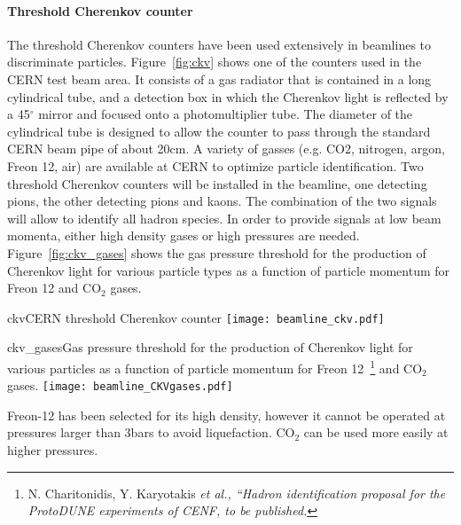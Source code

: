 \paragraph{Threshold Cherenkov counter}
The threshold Cherenkov counters have been used extensively in beamlines to discriminate particles. Figure~\ref{fig:ckv} shows one of the counters used in the CERN test beam area. It consists of a gas radiator that is contained in a long cylindrical tube, and a detection box in which the Cherenkov light is reflected by a 45$^\circ$ mirror and focused onto a photomultiplier tube. The diameter of the cylindrical tube is designed to allow the counter to pass through the standard CERN beam pipe of about 20cm. A variety of gasses (e.g. CO2, nitrogen, argon, Freon 12, air) are available at CERN to optimize particle identification. 
Two threshold Cherenkov counters will be installed in the beamline, one detecting pions, the other detecting pions 
and kaons. The combination of the two signals will allow to identify all hadron species. In order to provide signals at low beam momenta, either high density gases or high pressures are needed.
Figure~\ref{fig:ckv_gases} shows the gas pressure threshold 
for the production of Cherenkov light for various particle types as a function of particle momentum for Freon 12 and CO$_2$ gases.
\begin{cdrfigure}{ckv}{CERN threshold Cherenkov counter}
  \texttt{[image: beamline\_ckv.pdf]}
\end{cdrfigure}
\begin{cdrfigure}{ckv_gases}{Gas pressure threshold for the production of Cherenkov light for various particles as a function of particle momentum for Freon 12~\footnote{N. Charitonidis, Y. Karyotakis \it{et al.}, ``Hadron identification proposal for the ProtoDUNE experiments of CENF, to be published.} and CO$_2$ gases.}
  \texttt{[image: beamline\_CKVgases.pdf]}
\end{cdrfigure}
Freon-12 has been selected for its high density, however it cannot be operated at pressures larger than 3bars to avoid liquefaction.  CO$_2$ can be used more easily at higher pressures.  

